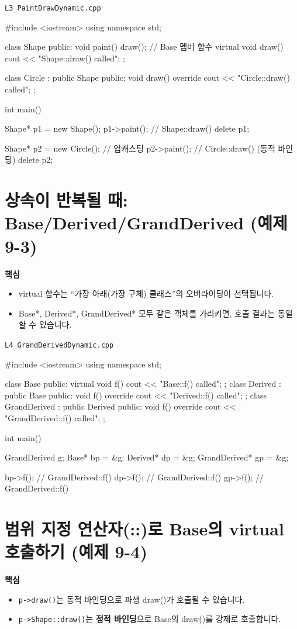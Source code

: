 \documentclass[11pt,a4paper]{article}
\newcommand{\filetag}[1]{\texttt{\color{Accent}#1}}
\begin{document}
\noindent\filetag{L3\_PaintDrawDynamic.cpp}
\begin{cppcode}
#include <iostream>
using namespace std;

class Shape {
public:
    void paint() { draw(); } // Base 멤버 함수
    virtual void draw() { cout << "Shape::draw() called\n"; }
};

class Circle : public Shape {
public:
    void draw() override { cout << "Circle::draw() called\n"; }
};

int main() {
    Shape* p1 = new Shape();
    p1->paint();  // Shape::draw()
    delete p1;

    Shape* p2 = new Circle(); // 업캐스팅
    p2->paint();  // Circle::draw() (동적 바인딩)
    delete p2;
}
\end{cppcode}

\section{상속이 반복될 때: Base/Derived/GrandDerived (예제 9-3)}
\begin{GoalBox}
\textbf{핵심}
\begin{itemize}[leftmargin=18pt]
  \item virtual 함수는 ``가장 아래(가장 구체) 클래스''의 오버라이딩이 선택됩니다.
  \item Base*, Derived*, GrandDerived* 모두 같은 객체를 가리키면, 호출 결과는 동일할 수 있습니다.
\end{itemize}
\end{GoalBox}

\noindent\filetag{L4\_GrandDerivedDynamic.cpp}
\begin{cppcode}
#include <iostream>
using namespace std;

class Base {
public:
    virtual void f() { cout << "Base::f() called\n"; }
};
class Derived : public Base {
public:
    void f() override { cout << "Derived::f() called\n"; }
};
class GrandDerived : public Derived {
public:
    void f() override { cout << "GrandDerived::f() called\n"; }
};

int main() {
    GrandDerived g;
    Base* bp = &g;
    Derived* dp = &g;
    GrandDerived* gp = &g;

    bp->f();  // GrandDerived::f()
    dp->f();  // GrandDerived::f()
    gp->f();  // GrandDerived::f()
}
\end{cppcode}

\section{범위 지정 연산자(::)로 Base의 virtual 호출하기 (예제 9-4)}
\begin{GoalBox}
\textbf{핵심}
\begin{itemize}[leftmargin=18pt]
  \item \texttt{p->draw()}는 동적 바인딩으로 파생 draw()가 호출될 수 있습니다.
  \item \texttt{p->Shape::draw()}는 \textbf{정적 바인딩}으로 Base의 draw()를 강제로 호출합니다.
\end{itemize}
\end{GoalBox}
\end{document}
